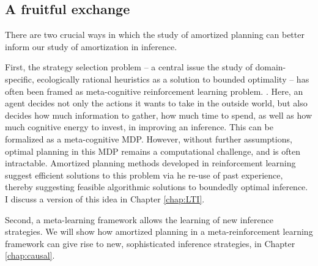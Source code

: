 

\subsection{A fruitful exchange}

There are two crucial ways in which the study of amortized planning can better inform our study of amortization in inference.

First, the strategy selection problem -- a central issue the study of domain-specific, ecologically rational heuristics as a solution to bounded optimality -- has often been framed as meta-cognitive reinforcement learning problem. \cite{erev2005adaptation, rieskamp2006ssl, lieder2017strategy}. Here, an agent decides not only the actions it wants to take in the outside world, but also decides how much information to gather, how much time to spend, as well as how much cognitive energy to invest, in improving an inference. This can be formalized as a meta-cognitive MDP. However, without further assumptions, optimal planning in this MDP remains a computational challenge, and is often intractable. Amortized planning methods developed in reinforcement learning suggest efficient solutions to this problem via he re-use of past experience, thereby suggesting feasible algorithmic solutions to boundedly optimal inference. I discuss a version of this idea in Chapter \ref{chap:LTI}.

Second, a meta-learning framework allows the learning of new inference strategies. We will show how amortized planning in a meta-reinforcement learning framework can give rise to new, sophisticated inference strategies, in Chapter \ref{chap:causal}.
